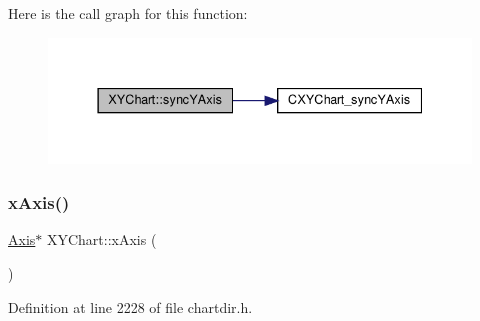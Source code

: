 Here is the call graph for this function\+:
\nopagebreak
\begin{figure}[H]
\begin{center}
\leavevmode
\includegraphics[width=337pt]{class_x_y_chart_a0d45ea4e19b8b60d93ca36b1f4f8f3fd_cgraph}
\end{center}
\end{figure}
\mbox{\label{class_x_y_chart_a4ae44126c336029899db3b70ee92b5f8}} 
\subsubsection{\texorpdfstring{x\+Axis()}{xAxis()}}
{\footnotesize\ttfamily \hyperlink{class_axis}{Axis}$\ast$ X\+Y\+Chart\+::x\+Axis (\begin{DoxyParamCaption}{ }\end{DoxyParamCaption})\hspace{0.3cm}{\ttfamily [inline]}}



Definition at line 2228 of file chartdir.\+h.

